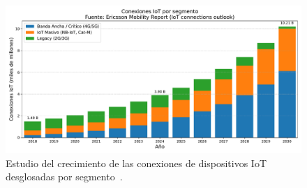 \begin{figure}[ht!]
   \centering
    \includegraphics[width=\textwidth]{fig/04_in-band/in_band_1.pdf}
    \caption{Estudio del crecimiento de las conexiones de dispositivos IoT desglosadas por segmento~\cite{ericsson2025_iot}.}
    \label{fig:in_band_1}
\end{figure}



